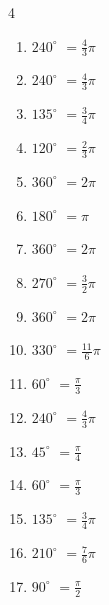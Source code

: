 \begin{multicols}{4}
\begin{enumerate}
  \item $\displaystyle 240^{\circ}$
        $\displaystyle =\frac{4}{3}\pi$

  \item $\displaystyle 240^{\circ}$
        $\displaystyle =\frac{4}{3}\pi$

  \item $\displaystyle 135^{\circ}$
        $\displaystyle =\frac{3}{4}\pi$

  \item $\displaystyle 120^{\circ}$
        $\displaystyle =\frac{2}{3}\pi$

  \item $\displaystyle 360^{\circ}$
        $\displaystyle =2\pi$

  \item $\displaystyle 180^{\circ}$
        $\displaystyle =\pi$

  \item $\displaystyle 360^{\circ}$
        $\displaystyle =2\pi$

  \item $\displaystyle 270^{\circ}$
        $\displaystyle =\frac{3}{2}\pi$

\columnbreak %

\resetques

  \item $\displaystyle 360^{\circ}$
        $\displaystyle =2\pi$

  \item $\displaystyle 330^{\circ}$
        $\displaystyle =\frac{11}{6}\pi$

  \item $\displaystyle 60^{\circ}$
        $\displaystyle =\frac{\pi}{3}$

  \item $\displaystyle 240^{\circ}$
        $\displaystyle =\frac{4}{3}\pi$

  \item $\displaystyle 45^{\circ}$
        $\displaystyle =\frac{\pi}{4}$

  \item $\displaystyle 60^{\circ}$
        $\displaystyle =\frac{\pi}{3}$

  \item $\displaystyle 135^{\circ}$
        $\displaystyle =\frac{3}{4}\pi$

  \item $\displaystyle 210^{\circ}$
        $\displaystyle =\frac{7}{6}\pi$

  \item $\displaystyle 90^{\circ}$
        $\displaystyle =\frac{\pi}{2}$


\end{enumerate}
\end{multicols}
